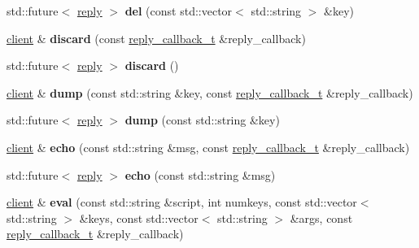 \begin{DoxyCompactItemize}
std\+::future$<$ \mbox{\hyperlink{classcpp__redis_1_1reply}{reply}} $>$ {\bfseries del} (const std\+::vector$<$ std\+::string $>$ \&key)
\item 
\mbox{\label{classcpp__redis_1_1client_a0f5a07744750f87504f72dcf66144a24}} 
\mbox{\hyperlink{classcpp__redis_1_1client}{client}} \& {\bfseries discard} (const \mbox{\hyperlink{classcpp__redis_1_1client_af7a65eb21aa25230bfbb0b0203c4fc04}{reply\+\_\+callback\+\_\+t}} \&reply\+\_\+callback)
\item 
\mbox{\label{classcpp__redis_1_1client_ab37e125f4f94bfa9455dc29f64698e47}} 
std\+::future$<$ \mbox{\hyperlink{classcpp__redis_1_1reply}{reply}} $>$ {\bfseries discard} ()
\item 
\mbox{\label{classcpp__redis_1_1client_aed6bb7657acdd4ea4dd0a4e7ec3eec20}} 
\mbox{\hyperlink{classcpp__redis_1_1client}{client}} \& {\bfseries dump} (const std\+::string \&key, const \mbox{\hyperlink{classcpp__redis_1_1client_af7a65eb21aa25230bfbb0b0203c4fc04}{reply\+\_\+callback\+\_\+t}} \&reply\+\_\+callback)
\item 
\mbox{\label{classcpp__redis_1_1client_aa25f7f2648c1a013ce079ef13e8e2f0f}} 
std\+::future$<$ \mbox{\hyperlink{classcpp__redis_1_1reply}{reply}} $>$ {\bfseries dump} (const std\+::string \&key)
\item 
\mbox{\label{classcpp__redis_1_1client_a285d35a355052ae1757d13ecec0539e8}} 
\mbox{\hyperlink{classcpp__redis_1_1client}{client}} \& {\bfseries echo} (const std\+::string \&msg, const \mbox{\hyperlink{classcpp__redis_1_1client_af7a65eb21aa25230bfbb0b0203c4fc04}{reply\+\_\+callback\+\_\+t}} \&reply\+\_\+callback)
\item 
\mbox{\label{classcpp__redis_1_1client_af0e3462a35f72aeae1527f0cb3cc8570}} 
std\+::future$<$ \mbox{\hyperlink{classcpp__redis_1_1reply}{reply}} $>$ {\bfseries echo} (const std\+::string \&msg)
\item 
\mbox{\label{classcpp__redis_1_1client_aeb773d0e0cacb766a0c4c7641bd91ebf}} 
\mbox{\hyperlink{classcpp__redis_1_1client}{client}} \& {\bfseries eval} (const std\+::string \&script, int numkeys, const std\+::vector$<$ std\+::string $>$ \&keys, const std\+::vector$<$ std\+::string $>$ \&args, const \mbox{\hyperlink{classcpp__redis_1_1client_af7a65eb21aa25230bfbb0b0203c4fc04}{reply\+\_\+callback\+\_\+t}} \&reply\+\_\+callback)

\end{DoxyCompactItemize}
